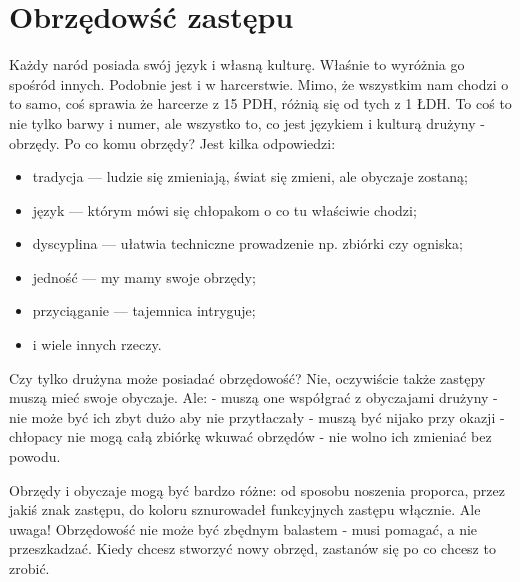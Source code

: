 \section{Obrzędowść zastępu}
Każdy naród posiada swój język i własną kulturę. Właśnie to wyróżnia go spośród innych. Podobnie jest i w  harcerstwie. Mimo, że wszystkim nam  chodzi o to samo, coś sprawia że harcerze z 15 PDH, różnią się od tych z 1 ŁDH. To  coś  to  nie  tylko  barwy i numer, ale wszystko to, co jest językiem i kulturą drużyny - obrzędy.
	Po co komu obrzędy? Jest  kilka  odpowiedzi:
\begin{itemize}[noitemsep] 
\item  tradycja --- ludzie się zmieniają,  świat się zmieni,  ale obyczaje zostaną;
\item  język --- którym mówi się chłopakom o co tu  właściwie chodzi;
\item  dyscyplina --- ułatwia techniczne prowadzenie np. zbiórki czy ogniska;
\item  jedność --- my mamy swoje obrzędy;
\item  przyciąganie ---  tajemnica intryguje;
\item  i wiele innych rzeczy.
\end{itemize}
	Czy tylko drużyna może posiadać obrzędowość? Nie, oczywiście także zastępy muszą mieć swoje obyczaje. Ale:
-  muszą one współgrać z obyczajami drużyny
- nie może być  ich zbyt  dużo  aby  nie  przytłaczały
- muszą być nijako przy  okazji - chłopacy nie mogą całą zbiórkę wkuwać obrzędów
- nie wolno ich zmieniać bez powodu.

	Obrzędy i obyczaje  mogą  być  bardzo  różne:  od  sposobu  noszenia  proporca, przez  jakiś  znak  zastępu,  do  koloru  sznurowadeł  funkcyjnych zastępu  włącznie.  Ale uwaga! Obrzędowość nie  może być zbędnym balastem - musi pomagać, a nie  przeszkadzać.
	Kiedy chcesz stworzyć nowy obrzęd,  zastanów się po co chcesz to  zrobić. 
